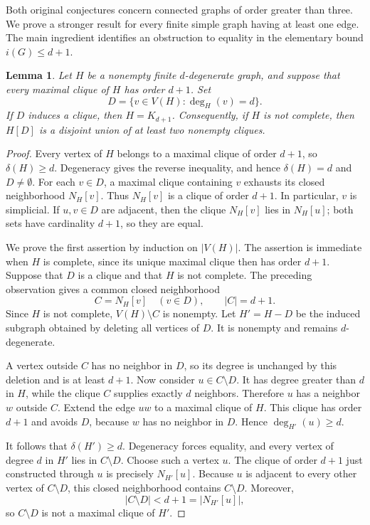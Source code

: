 \documentclass[11pt,a4paper]{article}
\newtheorem{lemma}[theorem]{Lemma}
\theoremstyle{remark}
\begin{document}
Both original conjectures concern connected graphs of order greater than
three.  We prove a stronger result for every finite simple graph having at
least one edge.  The main ingredient identifies an obstruction to equality
in the elementary bound $i(G)\le d+1$.

\begin{lemma}
\label{newdeg:cliquelemma}
Let $H$ be a nonempty finite $d$-degenerate graph, and suppose that every
maximal clique of $H$ has order $d+1$.  Set
\[
 D=\{v\in V(H):\deg_H(v)=d\}.
\]
If $D$ induces a clique, then $H=K_{d+1}$.  Consequently, if $H$ is not
complete, then $H[D]$ is a disjoint union of at least two nonempty cliques.
\end{lemma}

\begin{proof}
Every vertex of $H$ belongs to a maximal clique of order $d+1$, so
$\delta(H)\ge d$.  Degeneracy gives the reverse inequality, and hence
$\delta(H)=d$ and $D\ne\emptyset$.  For each $v\in D$, a maximal clique
containing $v$ exhausts its closed neighborhood $N_H[v]$.  Thus $N_H[v]$ is
a clique of order $d+1$.  In particular, $v$ is simplicial.  If $u,v\in D$
are adjacent, then the clique $N_H[v]$ lies in $N_H[u]$; both sets have
cardinality $d+1$, so they are equal.

We prove the first assertion by induction on $|V(H)|$.  The assertion is
immediate when $H$ is complete, since its unique maximal clique then has
order $d+1$.  Suppose that $D$ is a clique and that $H$ is not complete.
The preceding observation gives a common closed neighborhood
\[
 C=N_H[v]\quad (v\in D),
 \qquad |C|=d+1.
\]
Since $H$ is not complete, $V(H)\setminus C$ is nonempty.  Let
$H'=H-D$ be the induced subgraph obtained by deleting all vertices of $D$.
It is nonempty and remains $d$-degenerate.

A vertex outside $C$ has no neighbor in $D$, so its degree is unchanged by
this deletion and is at least $d+1$.  Now consider $u\in C\setminus D$.
It has degree greater than $d$ in $H$, while the clique $C$ supplies exactly
$d$ neighbors.  Therefore $u$ has a neighbor $w$ outside $C$.  Extend the
edge $uw$ to a maximal clique of $H$.  This clique has order $d+1$ and
avoids $D$, because $w$ has no neighbor in $D$.  Hence
$\deg_{H'}(u)\ge d$.

It follows that $\delta(H')\ge d$.  Degeneracy forces equality, and every
vertex of degree $d$ in $H'$ lies in $C\setminus D$.  Choose such a vertex
$u$.  The clique of order $d+1$ just constructed through $u$ is precisely
$N_{H'}[u]$.  Because $u$ is adjacent to every other vertex of
$C\setminus D$, this closed neighborhood contains $C\setminus D$.
Moreover,
\[
 |C\setminus D|<d+1=|N_{H'}[u]|,
\]
so $C\setminus D$ is not a maximal clique of $H'$.


\end{proof}
\end{document}
